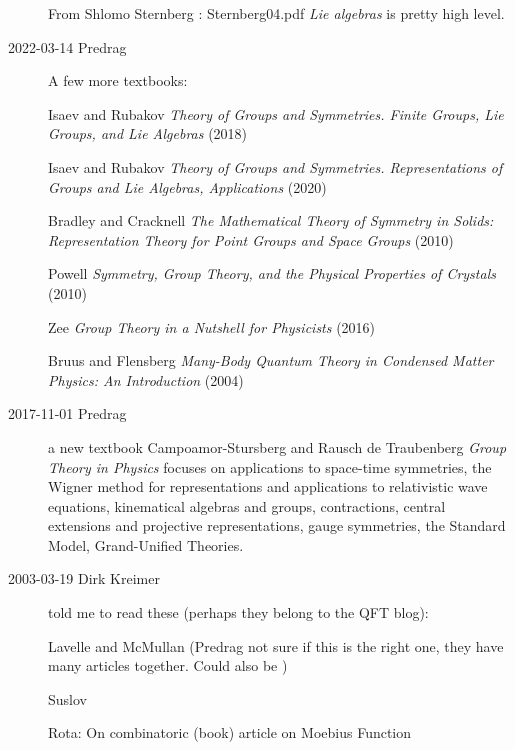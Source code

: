 \begin{description}
From Shlomo Sternberg
:
Sternberg04.pdf {\em Lie algebras} is pretty high level.

\item[2022-03-14 Predrag] A few more textbooks:

Isaev and Rubakov
{\em Theory of Groups and Symmetries. Finite Groups, Lie Groups, and
Lie Algebras} (2018) 

Isaev and Rubakov
{\em Theory of Groups and Symmetries.
Representations of Groups and Lie Algebras, Applications}
(2020) 

Bradley and Cracknell
{\em The Mathematical Theory of Symmetry in Solids:
Representation Theory for Point Groups and Space Groups}
(2010) 

Powell
{\em Symmetry, Group Theory, and the Physical Properties of Crystals}
(2010) 

Zee {\em Group Theory in a Nutshell for Physicists}
(2016) 

Bruus and Flensberg
{\em Many-Body Quantum Theory in Condensed Matter Physics: An Introduction}
(2004) 

\item[2017-11-01  Predrag] a new textbook
Campoamor-Stursberg and Rausch de Traubenberg
{\em Group Theory in Physics} focuses on applications to space-time
symmetries, the Wigner method for representations and applications to
relativistic wave equations, kinematical algebras and groups,
contractions, central extensions and projective representations, gauge
symmetries, the Standard Model, Grand-Unified Theories.

\item[2003-03-19  Dirk Kreimer] told me to
read these (perhaps they belong to the QFT blog):

Lavelle and McMullan
(Predrag not sure if this is the right one, they have many articles together.
Could also be )

Suslov

Rota: On combinatoric (book)
	article on Moebius Function



\end{description}
